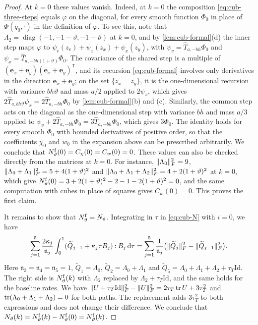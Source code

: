\begin{proof}
At $k=0$ these values vanish. Indeed, at $k=0$ the composition
\eqref{eq:cub-three-steps} equals $\varphi$ on the diagonal, for every smooth
function $\Phi_0$ in place of $\Phi(q_0,\cdot)$ in the definition of
$\varphi$. To see this, note that $\Lambda_2=\operatorname{diag}(-1,-1-\vartheta,
-1-\vartheta)$ at $k=0$, and by \cref{lem:cub-formal}(d) the inner step maps
$\varphi$ to $\psi_v(z_v)+\psi_x(z_x)+\psi_x(z_y)$, with
$\psi_v=\widehat T_{a,-bh}\Phi_0$ and $\psi_x=\widehat T_{a,-bh(1+\vartheta)}\Phi_0$.
The covariance of the shared step is a multiple of $(\mathbf e_x+\mathbf
e_y)(\mathbf e_x+\mathbf e_y)^{\mathsf T}$, and its recursion \eqref{eq:cub-formal}
involves only derivatives in the direction $\mathbf e_x+\mathbf e_y$; on the
set $\{z_x=z_y\}$, it is the one-dimensional recursion with variance
$bh\vartheta$ and mass $a/2$ applied to $2\psi_x$, which gives
$2\widehat T_{a,bh\vartheta}\psi_x=2\widehat T_{a,-bh}\Phi_0$ by
\cref{lem:cub-formal}(b) and (c). Similarly, the common step acts on the
diagonal as the one-dimensional step with variance $bh$ and mass $a/3$ applied
to $\psi_v+2\widehat T_{a,-bh}\Phi_0=3\widehat T_{a,-bh}\Phi_0$, which gives
$3\Phi_0$. The identity holds for every smooth $\Phi_0$ with bounded
derivatives of positive order, so that the coefficients $\chi_0$ and $w_0$ in
the expansion above can be prescribed arbitrarily. We conclude that
$N_\vartheta^{\rm f}(0)=C_\chi(0)=C_w(0)=0$. These values can
also be checked directly from the matrices at $k=0$. For instance,
$\lVert \Lambda_0\rVert_F^2=9$, $\lVert \Lambda_0+\Lambda_1\rVert_F^2=5+4(1+\vartheta)^2$ and
$\lVert \Lambda_0+\Lambda_1+\Lambda_2\rVert_F^2=4+2(1+\vartheta)^2$ at $k=0$, which
give $N^{\rm f}_\vartheta(0)=3+2(1+\vartheta)^2-2-1-2(1+\vartheta)^2=0$, and
the same computation with cubes in place of squares gives $C_w(0)=0$. This
proves the first claim.

It remains to show that $N^{\rm f}_\vartheta=N_\vartheta$. Integrating in
$\tau$ in \eqref{eq:cub-N} with $i=0$, we have
\[
 \sum_{j=1}^5\frac{2\kappa_j}{\mathfrak n_j}\int_0^1(\widetilde Q_{j-1}+\kappa_j\tau
 B_j)\mathbin:B_j\,\mathrm d\tau
 =\sum_{j=1}^5\frac1{\mathfrak n_j}\bigl(\lVert \widetilde Q_j\rVert_F^2-\lVert \widetilde Q_{j-1}\rVert_F^2\bigr).
\]
Here $\mathfrak n_3=\mathfrak n_4=\mathfrak n_5=1$, $\widetilde Q_1=\Lambda_0$, $\widetilde
Q_2=\Lambda_0+\Lambda_1$ and $\widetilde Q_5=\Lambda_0+\Lambda_1+\Lambda_2+\tau_T\mathrm{Id}$.
The right side is $N^{\rm f}_\vartheta(k)$ with $\Lambda_2$ replaced by
$\Lambda_2+\tau_T\mathrm{Id}$, and the same holds for the baseline rates. We have
$\lVert U+\tau_T\mathrm{Id}\rVert_F^2-\lVert U\rVert_F^2=2\tau_T\operatorname{tr} U+3\tau_T^2$ and
$\operatorname{tr}(\Lambda_0+\Lambda_1+\Lambda_2)=0$ for both paths. The replacement
adds $3\tau_T^2$ to both expressions and does not change their difference. We conclude
that $N_\vartheta(k)=N_\vartheta^{\rm f}(k)-N_\vartheta^{\rm f}(0)=N_\vartheta^{\rm f}(k)$.
\end{proof}

